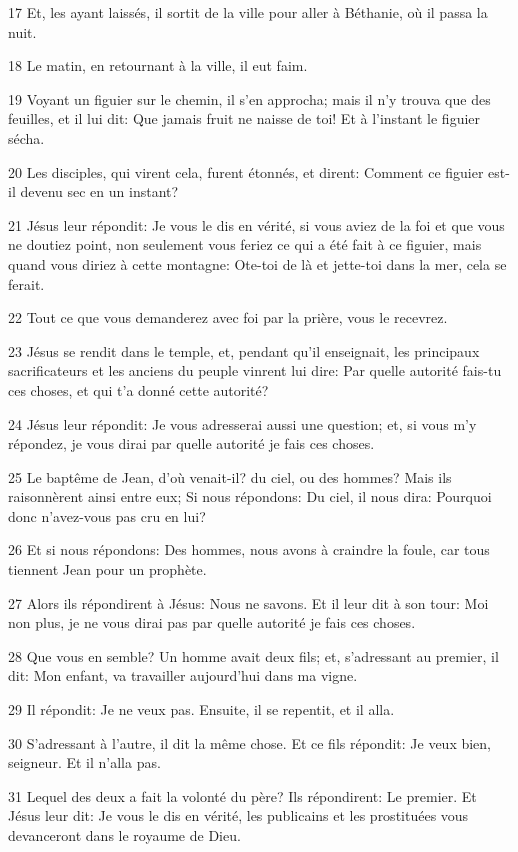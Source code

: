 \par 17 Et, les ayant laissés, il sortit de la ville pour aller à Béthanie, où il passa la nuit.
\par 18 Le matin, en retournant à la ville, il eut faim.
\par 19 Voyant un figuier sur le chemin, il s'en approcha; mais il n'y trouva que des feuilles, et il lui dit: Que jamais fruit ne naisse de toi! Et à l'instant le figuier sécha.
\par 20 Les disciples, qui virent cela, furent étonnés, et dirent: Comment ce figuier est-il devenu sec en un instant?
\par 21 Jésus leur répondit: Je vous le dis en vérité, si vous aviez de la foi et que vous ne doutiez point, non seulement vous feriez ce qui a été fait à ce figuier, mais quand vous diriez à cette montagne: Ote-toi de là et jette-toi dans la mer, cela se ferait.
\par 22 Tout ce que vous demanderez avec foi par la prière, vous le recevrez.
\par 23 Jésus se rendit dans le temple, et, pendant qu'il enseignait, les principaux sacrificateurs et les anciens du peuple vinrent lui dire: Par quelle autorité fais-tu ces choses, et qui t'a donné cette autorité?
\par 24 Jésus leur répondit: Je vous adresserai aussi une question; et, si vous m'y répondez, je vous dirai par quelle autorité je fais ces choses.
\par 25 Le baptême de Jean, d'où venait-il? du ciel, ou des hommes? Mais ils raisonnèrent ainsi entre eux; Si nous répondons: Du ciel, il nous dira: Pourquoi donc n'avez-vous pas cru en lui?
\par 26 Et si nous répondons: Des hommes, nous avons à craindre la foule, car tous tiennent Jean pour un prophète.
\par 27 Alors ils répondirent à Jésus: Nous ne savons. Et il leur dit à son tour: Moi non plus, je ne vous dirai pas par quelle autorité je fais ces choses.
\par 28 Que vous en semble? Un homme avait deux fils; et, s'adressant au premier, il dit: Mon enfant, va travailler aujourd'hui dans ma vigne.
\par 29 Il répondit: Je ne veux pas. Ensuite, il se repentit, et il alla.
\par 30 S'adressant à l'autre, il dit la même chose. Et ce fils répondit: Je veux bien, seigneur. Et il n'alla pas.
\par 31 Lequel des deux a fait la volonté du père? Ils répondirent: Le premier. Et Jésus leur dit: Je vous le dis en vérité, les publicains et les prostituées vous devanceront dans le royaume de Dieu.
